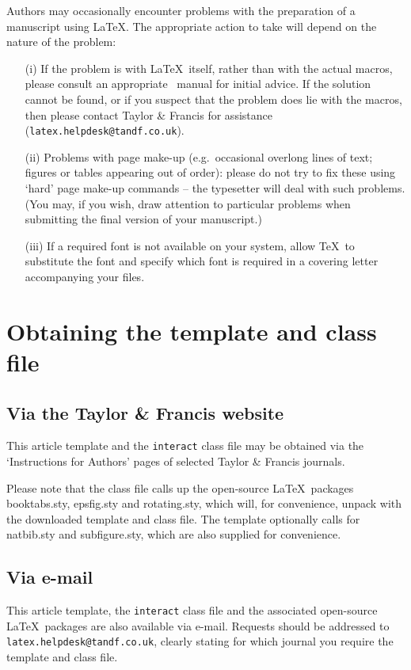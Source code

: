 \documentclass[]{interact}
\theoremstyle{plain}%
\theoremstyle{definition}
\theoremstyle{remark}
\begin{document}
Authors may occasionally encounter problems with the preparation of a manuscript using \LaTeX. The appropriate action to take will depend on the nature of the problem:
\begin{enumerate}
\item[(i)] If the problem is with \LaTeX\ itself, rather than with the actual macros, please consult an appropriate \LaTeXe\ manual for initial advice. If the solution cannot be found, or if you suspect that the problem does lie with the macros, then please contact Taylor \& Francis for assistance (\texttt{latex.helpdesk@tandf.co.uk}).
\item[(ii)] Problems with page make-up (e.g.\ occasional overlong lines of text; figures or tables appearing out of order): please do not try to fix these using `hard' page make-up commands -- the typesetter will deal with such problems. (You may, if you wish, draw attention to particular problems when submitting the final version of your manuscript.)
\item[(iii)] If a required font is not available on your system, allow \TeX\ to substitute the font and specify which font is required in a covering letter accompanying your files.
\end{enumerate}


\section{Obtaining the template and class file}

\subsection{Via the Taylor \& Francis website}

This article template and the \texttt{interact} class file may be obtained via the `Instructions for Authors' pages of selected Taylor \& Francis journals.

Please note that the class file calls up the open-source \LaTeX\ packages booktabs.sty, epsfig.sty and rotating.sty, which will, for convenience, unpack with the downloaded template and class file. The template optionally calls for natbib.sty and subfigure.sty, which are also supplied for convenience.


\subsection{Via e-mail}

This article template, the \texttt{interact} class file and the associated open-source \LaTeX\ packages are also available via e-mail. Requests should be addressed to \texttt{latex.helpdesk@tandf.co.uk}, clearly stating for which journal you require the template and class file.
\end{document}
